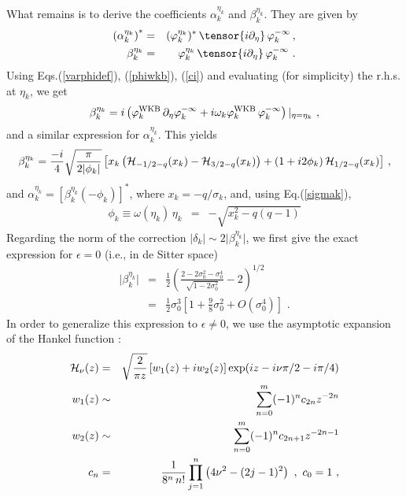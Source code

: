 \documentclass[a4paper,aps,prd,preprint,groupedaddress,nofootinbib]{revtex4}
\begin{document}
What remains is to derive the coefficients $\alpha_k^{\eta_k}$ and
$\beta_k^{\eta_k}$. They are given by
\begin{eqnarray}
\left(\alpha_k^{\eta_k}\right)^\ast& 
= &(\varphi_k^{\eta_k})^\ast\, \tensor{i
\partial_\eta}\, \varphi_k^{-\infty}\, ,
\nonumber\\
\beta_k^{\eta_k}& =& \varphi_k^{\eta_k}\, \tensor{i
\partial_\eta}\, \varphi_k^{-\infty}\,\,.
\end{eqnarray}
Using Eqs.(\ref{varphidef}), (\ref{phiwkb}), (\ref{ci})
and evaluating (for simplicity) the r.h.s. at $\eta_k$, we get
\begin{equation}
\beta_k^{\eta_k} = i \left( \varphi_k^{\rm WKB} \,
\partial_\eta \varphi_k^{-\infty} + i \omega_k
\varphi_k^{\rm WKB} \, \varphi_k^{-\infty} \right)\vert_{\eta=\eta_k}\,\,,
\end{equation}
and a similar expression for $\alpha_k^{\eta_k}$. This yields
\begin{equation}
\label{coeffs}
\beta_k^{\eta_k} = \frac{-i}{4} 
\sqrt{\frac{\pi}{2 \vert \phi_k \vert}}
 \left[ x_k \left({\cal H}_{-1/2-q}( x_k) - {\cal
H}_{3/2-q}( x_k)\right) + \left(1 + i2 \phi_k\right){\cal
H}_{1/2-q}( x_k)\right] \, , 
\end{equation}
and $\alpha_k^{\eta_k} = \left[ \beta_k^{\eta_k}(-\phi_k)
\right]^\ast$, 
where 
$ x_k = -q/\sigma_k$, and, using Eq.(\ref{sigmak}),
\begin{eqnarray}
\label{phidef}
\phi_k \equiv \omega(\eta_k)\, \eta_k &=&
- \sqrt{x_k^2 - {q(q-1)}} 
\end{eqnarray}
Regarding the norm of the correction
$\vert\delta_k\vert \sim 2 \vert\beta_k^{\eta_k}\vert$,
we first give the exact expression for $\epsilon = 0$ (i.e., in de Sitter space)  
\begin{eqnarray}
\label{betadS}
\vert\beta_k^{\eta_k}\vert &=& \frac{1}{2}\left(\frac{2 - 2\sigma_0^2 -
 \sigma_0^4}{\sqrt{1 - 2 \sigma_0^2}} - 2\right)^{1/2}
\nonumber\\
&=& \frac{1}{2}  \sigma_0^3\left[ 1+ \frac{9}{8} \sigma_0^2 + 
O( \sigma_0^4) \right]\,\,.
\end{eqnarray}
In order to generalize this expression to $\epsilon \neq 0$, we use the asymptotic 
expansion of the Hankel function \cite{BO78}:
\begin{eqnarray}
{\cal H}_\nu(z)& = & \sqrt{\frac{2}{\pi z}}\,[ w_1(z) + i  w_2(z)]
\exp(iz - i\nu \pi/2 - i\pi/4) \nonumber\\
w_1(z) & \sim & \sum\limits_{n=0}^m (-1)^n c_{2n} z^{-2n}\nonumber\\
w_2(z) & \sim & \sum\limits_{n=0}^m (-1)^n c_{2n+1} z^{-2n-1}\nonumber\\
c_n & = & \frac{1}{8^n\,n!} \prod\limits_{j=1}^n \left(4 \nu^2 -
(2 j -1)^2\right)\,\,,\,\,c_0 = 1 \,\,,
\end{eqnarray}
\end{document}
